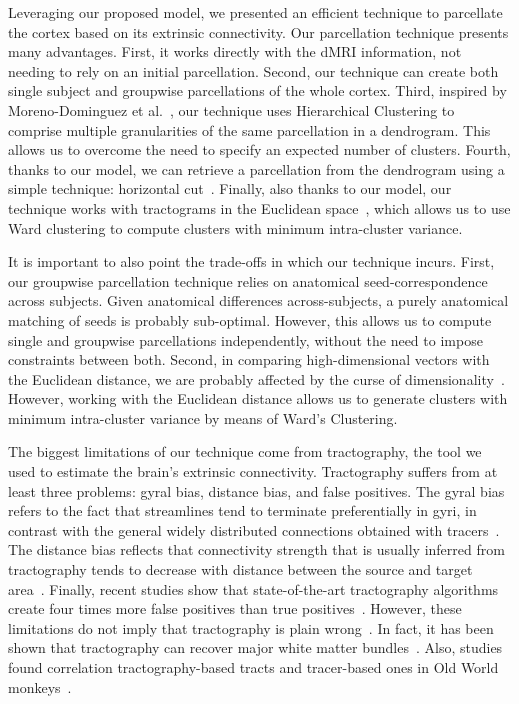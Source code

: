 Leveraging our proposed model, we presented an efficient technique to parcellate
the cortex based on its extrinsic connectivity. Our parcellation technique presents
many advantages. First, it works directly with the dMRI information, not needing
to rely on an initial parcellation. Second, our technique can create both
single subject and groupwise parcellations of the whole cortex. Third, inspired
by Moreno-Dominguez et al.~\cite{Moreno-Dominguez2014}, our technique uses Hierarchical
Clustering to comprise multiple granularities of the same parcellation in a
dendrogram. This allows us to overcome the need to specify an expected number
of clusters. Fourth, thanks to our model, we can retrieve a parcellation from
the dendrogram using a simple technique: horizontal cut~\cite{Murtagh2011}.
Finally, also thanks to our model, our technique works with tractograms
in the Euclidean space~\cite{Pohl2007}, which allows us to use Ward clustering
to compute clusters with minimum intra-cluster variance.

It is important to also point the trade-offs in which our technique incurs. First,
our groupwise parcellation technique relies on anatomical seed-correspondence across
subjects. Given anatomical differences across-subjects, a purely anatomical
matching of seeds is probably sub-optimal. However, this allows us to compute
single and groupwise parcellations independently, without the need to impose
constraints between both. Second, in comparing high-dimensional vectors with the
Euclidean distance, we are probably affected by the curse of dimensionality~\cite{Beyer1999}.
However, working with the Euclidean distance allows us to generate clusters with
minimum intra-cluster variance by means of Ward's Clustering.

The biggest limitations of our technique come from tractography, the tool
we used to estimate the brain's extrinsic connectivity. Tractography suffers
from at least three problems: gyral bias, distance bias, and false positives.
The gyral bias refers to the fact that streamlines tend to terminate preferentially
in gyri, in contrast with the general widely distributed connections obtained with
tracers~\cite{VanEssen2014}. The distance bias reflects that connectivity strength
that is usually inferred from tractography tends to decrease with distance
between the source and target area~\cite{Jbabdi2013}. Finally, recent studies
show that state-of-the-art tractography algorithms create four times more false
positives than true positives~\cite{Hein2016}. However, these limitations do not
imply that tractography is plain wrong~\cite{Asimov1988}. In fact, it has been
shown that tractography can recover major white matter bundles~\cite{Catani2008}.
Also, studies found correlation tractography-based tracts and tracer-based
ones in Old World monkeys~\cite{Donahue2016}.

